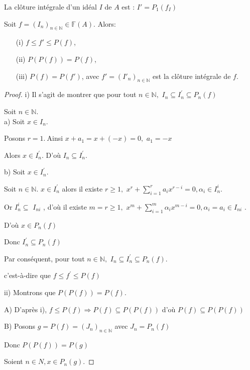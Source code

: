 \begin{maremarque}
	La clôture intégrale d'un idéal $I$ de $A$ est : $I'=P_1(f_I)$
\end{maremarque}
\begin{maproposition}
	Soit $f=(I_n)_{n \in \mathbb{N}} \in \mathbb{F}(A)$. Alors:\\
	\begin{enumerate}
		\item[(i)] $ f \leqslant f' \leqslant P(f)$,
		\item[(ii)] $ P(P(f)) = P(f)$,
		\item[(iii)] $P(f) = P(f')$, avec $f'=(I'_n)_{n \in \mathbb{N}}$ est la clôture intégrale de $f$.
	\end{enumerate}
\end{maproposition}
\begin{proof}
	i) Il s'agit de montrer que pour tout $n\in \mathbb{N},$ $I_{n}\subseteq I_{n}^{\prime }\subseteq P_{n}(f)$
	
	Soit $n\in \mathbb{N}.$ \\
	a) Soit $x\in I_{n}.$
	
	Posons $r=1.~$Ainsi $x+a_{1}=x+(-x)=0,$ $a_{1}=-x$
	
	Alors $x\in I_{n}^{\prime }.$ D'où $I_{n}\subseteq I_{n}^{\prime }.$
	
	b) Soit $x\in I_{n}^{\prime }.$
	
	Soit $n\in \mathbb{N}.$
	$x\in I_{n}^{\prime }$ alors il existe $r\geq 1,$ $x^{r}+\sum\limits_{i=1}^{r}a_{i}x^{r-i}=0,\alpha _{i}\in I_{n}^{i}$.
	
	Or $I_{n}^{i}\subseteq $ $I_{ni}$ , d'où il existe $m=r\geq 1,$ $x^{m}+\sum\limits_{i=1}^{m}\alpha _{i}x^{m-i}=0,\alpha _{i}=a_{i}\in I_{ni}$%
	.
	
	D'où $x\in P_{n}(f)$
	
	Donc $I_{n}^{\prime }\subseteq P_{n}(f)$
	
	Par conséquent, pour tout $n\in \mathbb{N},$ $I_{n}\subseteq I_{n}^{\prime }\subseteq P_{n}(f).$
	
	c'est-\`{a}-dire que $f\leq f^{\prime }\leq P(f)$
	
	ii) Montrons que $P(P(f))=P(f).$
	
	A) D'après i), $f\leq P(f)\Rightarrow P(f)\subseteq P(P(f))$ d'où $P(f)\subseteq P(P(f))$
	
	B) Posons $g=P(f)=(J_{n})_{n\in \mathbb{N}}$ avec $J_{n}=P_{n}(f)$
	
	Donc $P(P(f))=P(g)$
	
	Soient $n\in N,x\in P_{n}(g).$
	

\end{proof}
